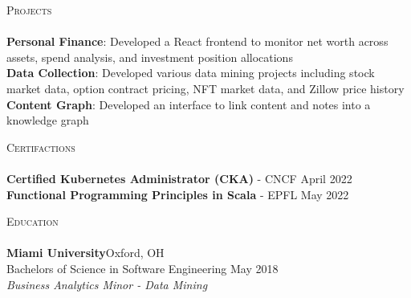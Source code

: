 \documentclass[a4paper]{article}
\newcommand{\lineunder} {
    \vspace*{-8pt} \\
    \hspace*{-18pt} \hrulefill \\
}
\newcommand{\header} [1] {
    {\hspace*{-18pt}\vspace*{6pt} \textsc{#1}}
    \vspace*{-6pt} \lineunder
}
\begin{document}
\header{Projects}
{\textbf{Personal Finance}}: Developed a React frontend to monitor net worth across assets, spend analysis, and investment position allocations\\
\vspace*{1mm}
{\textbf{Data Collection}}: Developed various data mining projects including stock market data, option contract pricing, NFT market data, and Zillow price history\\
\vspace*{1mm}
{\textbf{Content Graph}}: Developed an interface to link content and notes into a knowledge graph\\
\vspace*{3mm}

\header{Certifactions}
\textbf{Certified Kubernetes Administrator (CKA)} - CNCF \hfill April 2022\\
\vspace*{1mm}
\textbf{Functional Programming Principles in Scala} - EPFL \hfill May 2022\\
\vspace{3mm}

\header{Education}
\textbf{Miami University}\hfill Oxford, OH\\
Bachelors of Science in Software Engineering \hfill May 2018\\
\textit{Business Analytics Minor - Data Mining}\\

\ 
\end{document}
